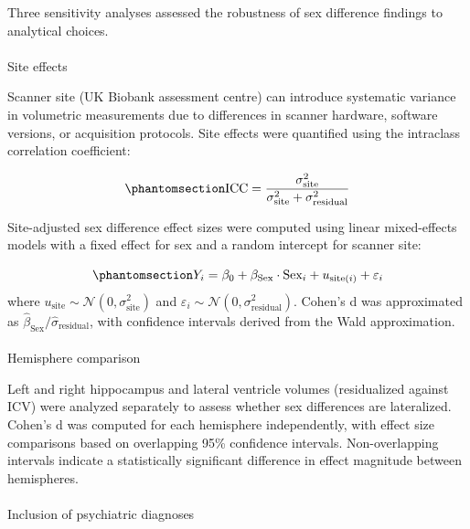 \documentclass[
]{article}
\makeatletter
\let\oldparagraph\paragraph
\renewcommand{\paragraph}{
    \@ifstar
      \xxxParagraphStar
      \xxxParagraphNoStar
  }
\newcommand{\xxxParagraphStar}[1]{\oldparagraph*{#1}\mbox{}}
\newcommand{\xxxParagraphNoStar}[1]{\oldparagraph{#1}\mbox{}}
\makeatother
\begin{document}
Three sensitivity analyses assessed the robustness of sex difference
findings to analytical choices.

\paragraph{Site effects}\label{site-effects}

Scanner site (UK Biobank assessment centre) can introduce systematic
variance in volumetric measurements due to differences in scanner
hardware, software versions, or acquisition protocols. Site effects were
quantified using the intraclass correlation coefficient:

\begin{equation}\phantomsection\label{eq-icc}{\text{ICC} = \frac{\sigma^2_{\text{site}}}{\sigma^2_{\text{site}} + \sigma^2_{\text{residual}}}}\end{equation}

Site-adjusted sex difference effect sizes were computed using linear
mixed-effects models with a fixed effect for sex and a random intercept
for scanner site:

\begin{equation}\phantomsection\label{eq-site-adj}{Y_i = \beta_0 + \beta_{\text{Sex}} \cdot \text{Sex}_i + u_{\text{site}(i)} + \varepsilon_i}\end{equation}
where \(u_{\text{site}} \sim \mathcal{N}(0, \sigma^2_{\text{site}})\)
and \(\varepsilon_i \sim \mathcal{N}(0, \sigma^2_{\text{residual}})\).
Cohen's d was approximated as
\(\hat{\beta}_{\text{Sex}} / \hat{\sigma}_{\text{residual}}\), with
confidence intervals derived from the Wald approximation.

\paragraph{Hemisphere comparison}\label{hemisphere-comparison}

Left and right hippocampus and lateral ventricle volumes (residualized
against ICV) were analyzed separately to assess whether sex differences
are lateralized. Cohen's d was computed for each hemisphere
independently, with effect size comparisons based on overlapping 95\%
confidence intervals. Non-overlapping intervals indicate a statistically
significant difference in effect magnitude between hemispheres.

\paragraph{Inclusion of psychiatric
diagnoses}\label{inclusion-of-psychiatric-diagnoses}
\end{document}
